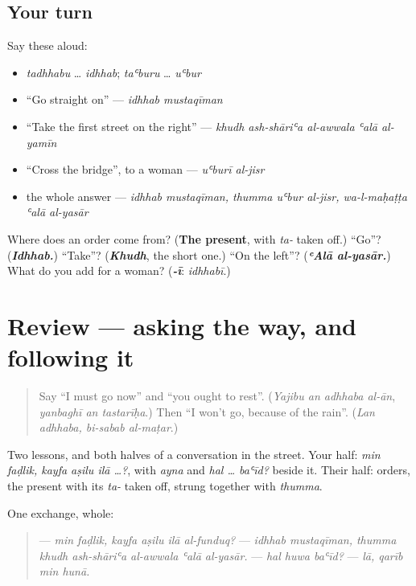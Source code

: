 \subsection*{Your turn}
Say these aloud:

\begin{itemize}
\raggedright
  \item \emph{tadhhabu} … \emph{idhhab}; \emph{taʿburu} … \emph{uʿbur}
  \item \textquotedblleft{}Go straight on\textquotedblright{} — \emph{idhhab mustaqīman}
  \item \textquotedblleft{}Take the first street on the right\textquotedblright{} — \emph{khudh ash-shāriʿa al-awwala ʿalā al-yamīn}
  \item \textquotedblleft{}Cross the bridge\textquotedblright{}, to a woman — \emph{uʿburī al-jisr}
  \item the whole answer — \emph{idhhab mustaqīman, thumma uʿbur al-jisr, wa-l-maḥaṭṭa ʿalā al-yasār}
\end{itemize}

\begin{tcolorbox}[breakable,colback=teal!4,colframe=teal!35!black,title={Before you move on}]
Where does an order come from? (\textbf{The present}, with \emph{ta-} taken off.) \textquotedblleft{}Go\textquotedblright{}? (\emph{\textbf{Idhhab.}}) \textquotedblleft{}Take\textquotedblright{}? (\emph{\textbf{Khudh}}, the short one.) \textquotedblleft{}On the left\textquotedblright{}? (\emph{\textbf{ʿAlā al-yasār.}}) What do you add for a woman? (\emph{\textbf{-ī}}: \emph{idhhabī}.)
\end{tcolorbox}
\section[(review)]{Review — asking the way, and following it}

\label{lesson:AR-R287-asking-the-way}



\begin{quote}
Say \textquotedblleft{}I must go now\textquotedblright{} and \textquotedblleft{}you ought to rest\textquotedblright{}. (\emph{Yajibu an adhhaba al-ān}, \emph{yanbaghī an tastarīḥa}.) Then \textquotedblleft{}I won't go, because of the rain\textquotedblright{}. (\emph{Lan adhhaba, bi-sabab al-maṭar}.)
\end{quote}

\begin{grammarlens}[title={What you've built}]
Two lessons, and both halves of a conversation in the street. Your half: \emph{min faḍlik, kayfa aṣilu ilā …?}, with \emph{ayna} and \emph{hal … baʿīd?} beside it. Their half: orders, the present with its \emph{ta-} taken off, strung together with \emph{thumma}.

One exchange, whole:

\begin{quote}
— \emph{min faḍlik, kayfa aṣilu ilā al-funduq?} — \emph{idhhab mustaqīman, thumma khudh ash-shāriʿa al-awwala ʿalā al-yasār.} — \emph{hal huwa baʿīd?} — \emph{lā, qarīb min hunā.}
\end{quote}
\end{grammarlens}

